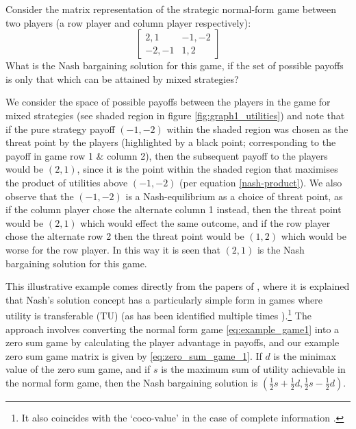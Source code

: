 \begin{example}
Consider the matrix representation of the strategic normal-form game between two players (a row player and column player respectively):
\begin{equation}\label{eq:example_game1} \begin{bmatrix}2,1 & -1,-2\\ -2,-1 & 1,2\end{bmatrix} \end{equation}
What is the Nash bargaining solution for this game, if the set of possible payoffs is only that which can be attained by mixed strategies?\end{example}
\begin{solution}
We consider the space of possible payoffs between the players in the game for mixed strategies (see shaded region in figure \ref{fig:graph1_utilities})
and note that if the pure strategy payoff $(-1,-2)$ within the shaded region was chosen as the threat point by the players (highlighted by a black point; corresponding to the payoff in game row 1 \& column 2), then the subsequent payoff to the players would be $(2,1)$, since it is the point within the shaded region that maximises the product of utilities above $(-1,-2)$ (per equation \ref{nash-product}).
We also observe that the $(-1,-2)$ is a Nash-equilibrium as a choice of threat point, as if the column player chose the alternate column 1 instead, then the threat point would be $(2,1)$ which would effect the same outcome, and if the row player chose the alternate row 2 then the threat point would be $(1,2)$ which would be worse for the row player.
In this way it is seen that $(2,1)$ is the Nash bargaining solution for this game.
\end{solution}
\vspace{2mm}



This illustrative example comes directly from the papers of \cite{value2,value1}, where it is explained that Nash's solution concept has a particularly simple form in games where utility is transferable (TU) (as has been identified multiple times \cite{value2,shap_lectures,value1}).\footnote{It also coincides with the `coco-value' in the case of complete information \citep{kalai1,Kalai2010}.}
The approach involves converting the normal form game \eqref{eq:example_game1} into a zero sum game by calculating the player advantage in payoffs, and our example zero sum game matrix is given by \eqref{eq:zero_sum_game_1}.
If $d$ is the minimax value of the zero sum game, and if $s$ is the maximum sum of utility achievable in the normal form game, then the Nash bargaining solution is $(\frac{1}{2}s+\frac{1}{2}d,\frac{1}{2}s-\frac{1}{2}d)$.

